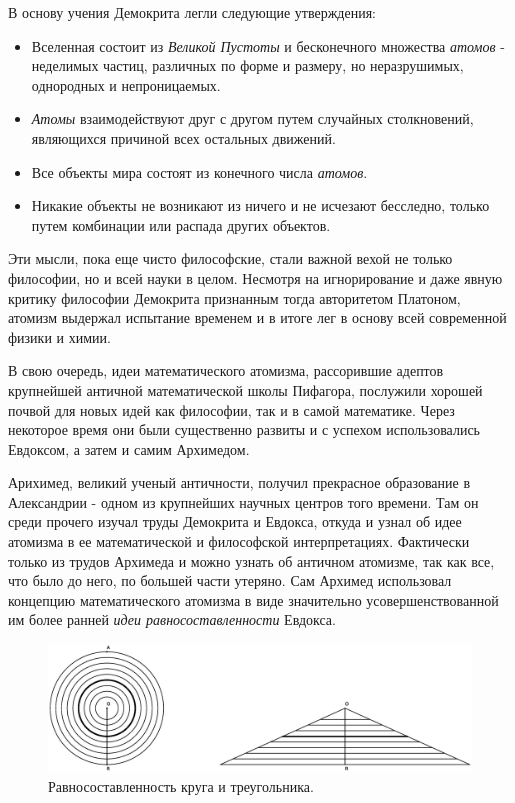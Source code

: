 В основу учения Демокрита легли следующие утверждения:
\begin{itemize}
    \item Вселенная состоит из \textit{Великой Пустоты} и бесконечного множества \textit{атомов} - неделимых частиц, различных по форме и размеру, но неразрушимых, однородных и непроницаемых.
    \item \textit{Атомы} взаимодействуют друг с другом путем случайных столкновений, являющихся причиной всех остальных движений. 
    \item Все объекты мира состоят из конечного числа \textit{атомов}.
    \item Никакие объекты не возникают из ничего и не исчезают бесследно, только путем комбинации или распада других объектов.
\end{itemize} 
Эти мысли, пока еще чисто философские, стали важной вехой не только философии, но и всей науки в целом.
Несмотря на игнорирование и даже явную критику философии Демокрита признанным тогда авторитетом Платоном, атомизм выдержал испытание временем и в итоге лег в основу всей современной физики и химии.

В свою очередь, идеи математического атомизма, рассорившие адептов крупнейшей античной математической школы Пифагора, послужили хорошей почвой для новых идей как философии, так и в самой математике.
Через некоторое время они были существенно развиты и с успехом использовались Евдоксом, а затем и самим Архимедом.

Арихимед, великий ученый античности, получил прекрасное образование в Александрии - одном из крупнейших научных центров того времени. 
Там он среди прочего изучал труды Демокрита и Евдокса, откуда и узнал об идее атомизма в ее математической и философской интерпретациях.
Фактически только из трудов Архимеда и можно узнать об античном атомизме, так как все, что было до него, по большей части утеряно.
Сам Архимед использовал концепцию математического атомизма в виде значительно усовершенствованной им более ранней \textit{идеи равносоставленности} Евдокса.

\begin{figure}[t]
   \centering
   \includegraphics[scale=0.44]{images/archimed_1}
   \caption{Равносоставленность круга и треугольника.}
   \label{fig:archimed_1}
\end{figure}

